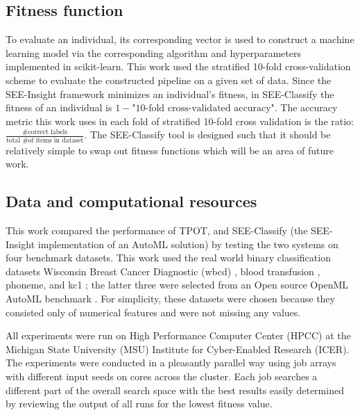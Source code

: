 \documentclass[acmsmall,screen]{acmart}
\begin{document}
\subsection{Fitness function} 
To evaluate an individual, its corresponding vector is used to construct a machine learning model via the corresponding algorithm and hyperparameters implemented in scikit-learn. This work used the stratified 10-fold cross-validation scheme to evaluate the constructed pipeline on a given set of data. Since the SEE-Insight framework minimizes an individual's fitness, in SEE-Classify the fitness of an individual is $1 - \text{"10-fold cross-validated accuracy"}$. The accuracy metric this work uses in each fold of stratified 10-fold cross validation is the ratio: $\frac{\text{\# correct labels}}{\text{total \# of items in dataset}}$. The SEE-Classify tool is designed such that it should be relatively simple to swap out fitness functions which will be an area of future work.

\subsection{Data and computational resources}
This work compared the performance of TPOT, and SEE-Classify (the SEE-Insight implementation of an AutoML solution) by testing the two systems on four benchmark datasets. This work used the real world binary classification datasets Wisconsin Breast Cancer Diagnostic (wbcd) \cite{misc_breast_cancer_wisconsin_(diagnostic)_17}, blood transfusion \cite{misc_blood_transfusion_service_center_176}, phoneme, and kc1 \cite{Sayyad-Shirabad+Menzies:2005}; the latter three were selected from an Open source OpenML AutoML benchmark \cite{amlb2019}. For simplicity, these datasets were chosen because they consisted only of numerical features and were not missing any values.


All experiments were run on  High Performance Computer Center ({HPCC}) at the Michigan State University ({MSU}) Institute for Cyber-Enabled Research ({ICER}). The experiments were conducted in a pleasantly parallel way using job arrays with different input seeds on cores across the cluster. Each job searches a different part of the overall search space with the best results easily determined by reviewing the output of all runs for the lowest fitness value.  %
\end{document}
